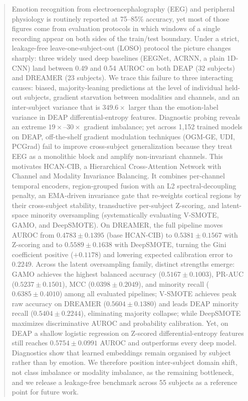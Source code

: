 \documentclass[a4paper,fleqn]{cas-sc}
\begin{document}
\begin{abstract}
Emotion recognition from electroencephalography (EEG) and peripheral physiology is routinely reported at 75--85\% accuracy, yet most of those figures come from evaluation protocols in which windows of a single recording appear on both sides of the train/test boundary. Under a strict, leakage-free leave-one-subject-out (LOSO) protocol the picture changes sharply: three widely used deep baselines (EEGNet, ACRNN, a plain 1D-CNN) land between 0.49 and 0.54 AUROC on both DEAP (32 subjects) and DREAMER (23 subjects). We trace this failure to three interacting causes: biased, majority-leaning predictions at the level of individual held-out subjects, gradient starvation between modalities and channels, and an inter-subject variance that is $349.6\times$ larger than the emotion-label variance in DEAP differential-entropy features. Diagnostic probing reveals an extreme $19\times$--$30\times$ gradient imbalance; yet across 1,152 trained models on DEAP, off-the-shelf gradient modulation techniques (OGM-GE, UDI, PCGrad) fail to improve cross-subject generalization because they treat EEG as a monolithic block and amplify non-invariant channels. This motivates HCAN-CIB, a Hierarchical Cross-Attention Network with Channel and Modality Invariance Balancing. It combines per-channel temporal encoders, region-grouped fusion with an L2 spectral-decoupling penalty, an EMA-driven invariance gate that re-weights cortical regions by their cross-subject stability, transductive per-subject Z-scoring, and latent-space minority oversampling (systematically evaluating V-SMOTE, GAMO, and DeepSMOTE). On DREAMER, the full pipeline moves AUROC from $0.4783\pm0.1395$ (base HCAN-CIB) to $0.5381\pm0.1567$ with Z-scoring and to $0.5589\pm0.1638$ with DeepSMOTE, turning the Gini coefficient positive ($+0.1178$) and lowering expected calibration error to $0.2249$. Across the latent oversampling family, distinct strengths emerge: GAMO achieves the highest balanced accuracy ($0.5167\pm0.1003$), PR-AUC ($0.5237\pm0.1501$), MCC ($0.0398\pm0.2049$), and minority recall ($0.6385\pm0.4010$) among all evaluated pipelines; V-SMOTE achieves peak raw accuracy on DREAMER ($0.5604\pm0.1380$) and leads DEAP minority recall ($0.5404\pm0.2244$), eliminating majority collapse; while DeepSMOTE maximizes discriminative AUROC and probability calibration. Yet, on DEAP a shallow logistic regression on Z-scored differential-entropy features still reaches $0.5754\pm0.0991$ AUROC and outperforms every deep model. Diagnostics show that learned embeddings remain organised by subject rather than by emotion. We therefore position inter-subject domain shift, not class imbalance or modality imbalance, as the remaining bottleneck, and we release a leakage-free benchmark across 55 subjects as a reference point for future work.
\end{abstract}
\end{document}
